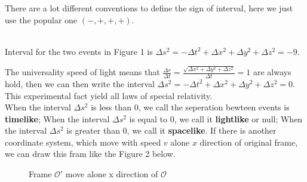 \documentclass[12pt]{article}
\theoremstyle{mystyle}{\newtheorem{definition}{Definition}[section]}
\theoremstyle{mystyle}{\newtheorem{theorem}[definition]{Theorem}}
\theoremstyle{mystyle}{\newtheorem*{remark}{Remark}}
\theoremstyle{mystyle}{\newtheorem*{example}{Example}}
\theoremstyle{mystyle}{\newtheorem*{examples}{Examples}}
\theoremstyle{cstyle}{\newtheorem*{cthm}{}}
\begin{document}
\begin{remark}\leavevmode
  There are a lot different conventions to define the sign of interval, here we just use the popular one \((-,+,+,+)\).
\end{remark}
\begin{example}\leavevmode %
  \\Interval for the two events in Figure 1 is $\Delta s^2 = - \Delta t^2 + \Delta x^2 + \Delta y^2 + \Delta z^2 = -9$.
\end{example}
The universality speed of light means that $\frac{\Delta r}{\Delta t} = \frac{\sqrt{\Delta x^2+ \Delta y^2 + \Delta z^2}}{\Delta t}=1$
are always hold, then we can then write the interval
$\Delta s^2 = - \Delta t^2 + \Delta x^2 + \Delta y^2 + \Delta z^2 = 0$. This experimental fact yield all laws of special relativity.
\\
When the interval $\Delta s^2$ is less than 0, we call the seperation bewteen events is \textbf{timelike};
When the interval $\Delta s^2$ is equal to 0, we call it \textbf{lightlike} or null;
When the interval $\Delta s^2$ is greater than 0, we call it \textbf{spacelike}.
If there is another coordinate system, which move with speed \(v\) alone \(x\) direction of original frame,
we can draw this fram like the Figure 2 below.
\begin{figure}[ht]
  \begin{center}
    \caption[]{Frame \(\mathcal{O}'\) move alone x direction of \(\mathcal{O}\)}
  \end{center}
\end{figure}
\end{document}
